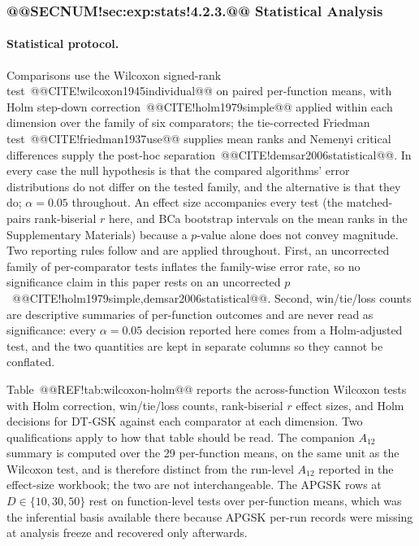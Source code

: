 \documentclass[10pt,a4paper]{article}
\newcommand{\dtgsk}{DT-GSK}
\newcommand{\apgsk}{APGSK}
\begin{document}
\subsubsection{@@SECNUM!sec:exp:stats!4.2.3.@@ Statistical Analysis}\label{sec:exp:stats}

\paragraph{Statistical protocol.}
Comparisons use the Wilcoxon signed-rank test~@@CITE!wilcoxon1945individual@@ on
paired per-function means, with Holm step-down
correction~@@CITE!holm1979simple@@ applied within each dimension over the family
of six comparators; the tie-corrected Friedman test~@@CITE!friedman1937use@@
supplies mean ranks and Nemenyi critical differences supply the post-hoc
separation~@@CITE!demsar2006statistical@@. In every case the null hypothesis is
that the compared algorithms' error distributions do not differ on the tested
family, and the alternative is that they do; $\alpha = 0.05$ throughout.
An effect size accompanies every test
(the matched-pairs rank-biserial $r$ here, and BCa bootstrap intervals on the
mean ranks in the Supplementary Materials) because a $p$-value alone does not
convey magnitude. Two reporting rules follow and are applied throughout. First,
an uncorrected family of per-comparator tests inflates the family-wise error
rate, so no significance claim in this paper rests on an uncorrected
$p$~@@CITE!holm1979simple,demsar2006statistical@@. Second, win/tie/loss counts are
descriptive summaries of per-function outcomes and are never read as
significance: every $\alpha = 0.05$ decision reported here comes from a
Holm-adjusted test, and the two quantities are kept in separate columns so they
cannot be conflated.

Table~@@REF!tab:wilcoxon-holm@@ reports the across-function Wilcoxon
tests with Holm correction, win/tie/loss counts, rank-biserial $r$ effect
sizes, and Holm decisions for \dtgsk{} against each comparator at
each dimension. Two qualifications apply to how that table should be
read. The companion $A_{12}$ summary is computed over the 29 per-function means,
on the same unit as the Wilcoxon test, and is therefore distinct from
the run-level $A_{12}$ reported in the effect-size workbook; the two
are not interchangeable. The \apgsk{} rows at
$D \in \{10, 30, 50\}$ rest on function-level tests over per-function
means, which was the inferential basis available there because \apgsk{}
per-run records were missing at analysis freeze and recovered only
afterwards.
\end{document}

